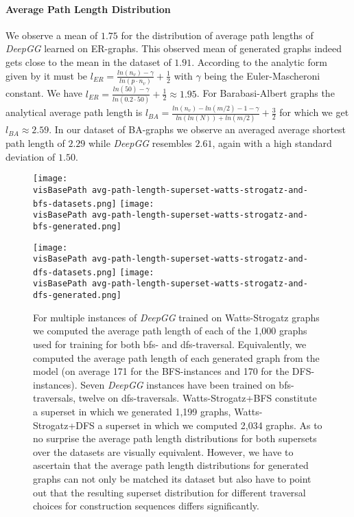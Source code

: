 \documentclass{article}
\newcommand{\visBasePath}[0]{vis/}
\begin{document}
\paragraph{Average Path Length Distribution}
We observe a mean of $1.75$ for the distribution of average path lengths of \textit{DeepGG} learned on ER-graphs.
This observed mean of generated graphs indeed gets close to the mean in the dataset of $1.91$.
According to the analytic form given by \cite{fronczak2004average} it must be $l_{ER} = \frac{ln(n_v)-\gamma}{ln(p\cdot n_v)}+\frac{1}{2}$ with $\gamma$ being the Euler-Mascheroni constant.
We have $l_{ER} = \frac{ln(50)-\gamma}{ln(0.2\cdot 50)}+\frac{1}{2} \approx 1.95$.
For Barabasi-Albert graphs the analytical average path length is $l_{BA} = \frac{ln(n_v)-ln(m/2)-1-\gamma}{ln(ln(N))+ln(m/2)}+\frac{3}{2}$ for which we get $l_{BA} \approx 2.59$.
In our dataset of BA-graphs we observe an averaged average shortest path length of $2.29$ while \textit{DeepGG} resembles $2.61$, again with a high standard deviation of $1.50$.




\begin{figure*}
  \begin{minipage}[c]{0.48\linewidth}
    \texttt{[image: \\visBasePath avg-path-length-superset-watts-strogatz-and-bfs-datasets.png]}
    \texttt{[image: \\visBasePath avg-path-length-superset-watts-strogatz-and-bfs-generated.png]}
  \end{minipage}\hfill
  \begin{minipage}[c]{0.48\linewidth}
    \texttt{[image: \\visBasePath avg-path-length-superset-watts-strogatz-and-dfs-datasets.png]}
    \texttt{[image: \\visBasePath avg-path-length-superset-watts-strogatz-and-dfs-generated.png]}
  \end{minipage}
    \caption{
      For multiple instances of \textit{DeepGG} trained on Watts-Strogatz graphs we computed the average path length of each of the 1,000 graphs used for training for both bfs- and dfs-traversal.
      Equivalently, we computed the average path length of each generated graph from the model (on average 171 for the BFS-instances and 170 for the DFS-instances).
      Seven \textit{DeepGG} instances have been trained on bfs-traversals, twelve on dfs-traversals.
      Watts-Strogatz+BFS constitute a superset in which we generated 1,199 graphs, Watts-Strogatz+DFS a superset in which we computed 2,034 graphs.
      As to no surprise the average path length distributions for both supersets over the datasets are visually equivalent.
      However, we have to ascertain that the average path length distributions for generated graphs can not only be matched its dataset but also have to point out that the resulting superset distribution for different traversal choices for construction sequences differs significantly.
    }
    \label{fig:avg-path-length-supersets}
\end{figure*}
\end{document}
